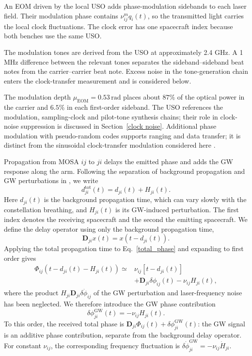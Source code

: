 An \ac{EOM} driven by the local USO adds phase-modulation sidebands to each laser field. Their modulation phase contains $\nu^m_{ij}q_i(t)$, so the transmitted light carries the local clock fluctuations. The clock error has one spacecraft index because both benches use the same USO.

The modulation tones are derived from the USO at approximately 2.4 GHz. A 1 MHz difference between the relevant tones separates the sideband--sideband beat notes from the carrier--carrier beat note. Excess noise in the tone-generation chain enters the clock-transfer measurement and is considered below.

The modulation depth $\mu_{\mathrm{EOM}}=0.53\,\mathrm{rad}$ places about $87\%$ of the optical power in the carrier and $6.5\%$ in each first-order sideband. The USO references the modulation, sampling-clock and pilot-tone synthesis chains; their role in clock-noise suppression is discussed in Section~\ref{clock noise}. Additional phase modulation with pseudo-random codes supports ranging and data transfer; it is distinct from the sinusoidal clock-transfer modulation considered here \cite{heinzel_auxiliary_2011}.

Propagation from \ac{MOSA} $ij$ to $ji$ delays the emitted phase and adds the GW response along the arm. Following the separation of background propagation and GW perturbations in \cite{bayle_unified_2023}, we write
\begin{equation}
    d^{\mathrm{tot}}_{ji}(t)=d_{ji}(t)+H_{ji}(t).
\end{equation}
Here $d_{ji}(t)$ is the background propagation time, which can vary slowly with the constellation breathing, and $H_{ji}(t)$ is its GW-induced perturbation. The first index denotes the receiving spacecraft and the second the emitting spacecraft.
We define the delay operator using only the background propagation time,
\begin{equation}
    \mathbf D_{ji}x(t)=x\!\left(t-d_{ji}(t)\right).
\end{equation}
Applying the total propagation time to Eq.~\eqref{total_phase} and expanding to first order gives
\begin{align*}
    \Phi_{ij}\!\left(t-d_{ji}(t)-H_{ji}(t)\right)
    \simeq{}&\nu_{ij}\left[t-d_{ji}(t)\right]\\
    &+\mathbf D_{ji}\delta\phi_{ij}(t)
    -\nu_{ij}H_{ji}(t),
\end{align*}
where the product $H_{ji}\mathbf D_{ji}\delta\dot\phi_{ij}$ of the GW perturbation and laser-frequency noise has been neglected. We therefore introduce the GW phase contribution
\begin{equation}\label{eq:gw_phase}
    \delta\phi^{\mathrm{GW}}_{ji}(t)=-\nu_{ij}H_{ji}(t).
\end{equation}
To this order, the received total phase is $\mathbf D_{ji}\Phi_{ij}(t)+\delta\phi^{\mathrm{GW}}_{ji}(t)$: the GW signal is an additive phase contribution, separate from the background delay operator. For constant $\nu_{ij}$, the corresponding frequency fluctuation is $\delta\dot\phi^{\mathrm{GW}}_{ji}=-\nu_{ij}\dot H_{ji}$.

